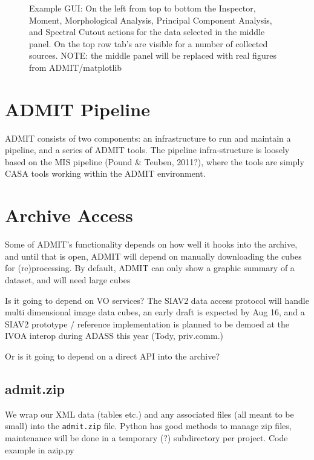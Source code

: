 \documentclass[preprint]{aastex} %
\begin{document}
\begin{figure}[ht]
\caption{Example GUI: On the left from top to bottom the Inspector, Moment, 
Morphological Analysis, Principal Component Analysis, and Spectral Cutout
actions for the data selected in the middle panel. On the top row tab's are
visible for a number of collected sources. NOTE: the middle panel will be replaced
with real figures from ADMIT/matplotlib}
\label{fig:gui1}
\end{figure}



\section{ADMIT Pipeline}


ADMIT consists of two components: an infrastructure to run
and maintain a pipeline, and a series of ADMIT tools. The pipeline
infra-structure is loosely based on the MIS pipeline (Pound \& Teuben, 2011?),
where the tools are simply CASA tools working within the ADMIT environment.


\section{Archive Access}

Some of ADMIT's functionality depends on how well it hooks into the archive,
and until that is open, ADMIT will depend on manually downloading the cubes
for (re)processing.  By default, ADMIT can only show a graphic summary of
a dataset, and will need large cubes

Is it going to depend on VO services? The SIAV2 data access protocol
will handle multi dimensional image data cubes, an early draft is expected
by Aug 16, and a SIAV2 prototype / reference implementation is planned to 
be demoed at the IVOA interop during ADASS this year (Tody, priv.comm.)

Or is it going to depend on a direct API into the archive?  


\subsection{admit.zip}

We wrap our XML data (tables etc.) and any associated files (all meant to be small)
into the {\tt admit.zip} file.
Python has good methods to manage zip files, maintenance will be done in 
a temporary (?) subdirectory per project. Code example in azip.py
\end{document}
